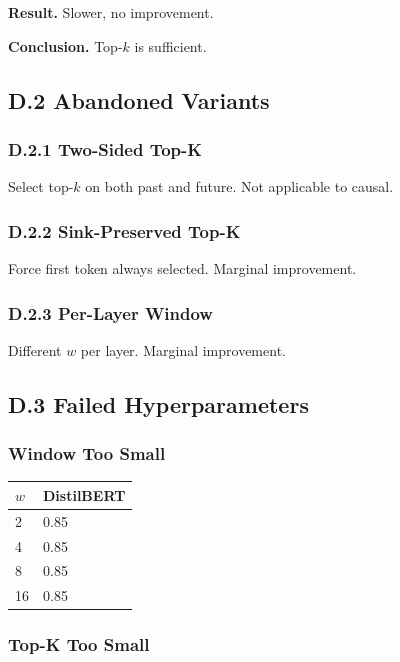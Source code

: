 \textbf{Result.} Slower, no improvement.

\textbf{Conclusion.} Top-$k$ is sufficient.

\subsection{D.2 Abandoned Variants}

\subsubsection{D.2.1 Two-Sided Top-K}

Select top-$k$ on both past and future. Not applicable to causal.

\subsubsection{D.2.2 Sink-Preserved Top-K}

Force first token always selected. Marginal improvement.

\subsubsection{D.2.3 Per-Layer Window}

Different $w$ per layer. Marginal improvement.

\subsection{D.3 Failed Hyperparameters}

\subsubsection{Window Too Small}

\begin{table}[H]
\centering
\small
\begin{tabular}{ll}
\toprule
\textbf{$w$} & \textbf{DistilBERT} \\
\midrule
2 & 0.85 \\
4 & 0.85 \\
8 & 0.85 \\
16 & 0.85 \\
\bottomrule
\end{tabular}
\end{table}

\subsubsection{Top-K Too Small}


